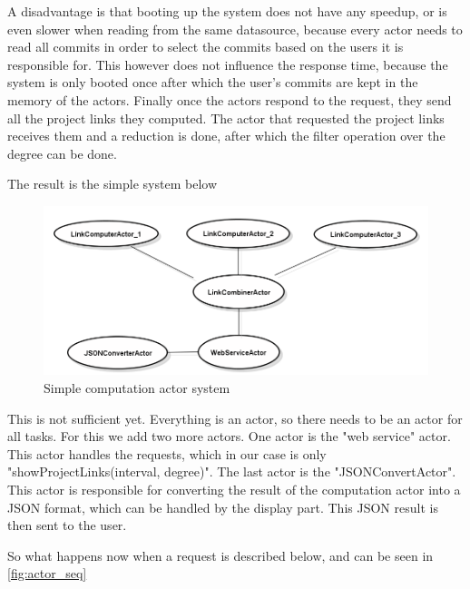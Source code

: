 \documentclass[10pt,a4paper]{article}
\begin{document}
A disadvantage is that booting up the system does not have any speedup, or is even slower when reading from the same datasource, because every actor needs to read all commits in order to select the commits based on the users it is responsible for. This however does not influence the response time, because the system is only booted once after which the user's commits are kept in the memory of the actors. Finally once the actors respond to the request, they send all the project links they computed. The actor that requested the project links receives them and a reduction is done, after which the filter operation over the degree can be done.

The result is the simple system below

\begin{figure}[htb]
    \centering
    \includegraphics[width=1.00\textwidth]{ActorSystemSample}
    \caption{Simple computation actor system}
    \label{fig:actor_sample}
\end{figure}

This is not sufficient yet. Everything is an actor, so there needs to be an actor for all tasks. For this we add two more actors. One actor is the "web service" actor. This actor handles the requests, which in our case is only "showProjectLinks(interval, degree)". The last actor is the "JSONConvertActor". This actor is responsible for converting the result of the computation actor into a JSON format, which can be handled by the display part. This JSON result is then sent to the user.

So what happens now when a request is described below, and can be seen in \ref{fig:actor_seq}
\end{document}
